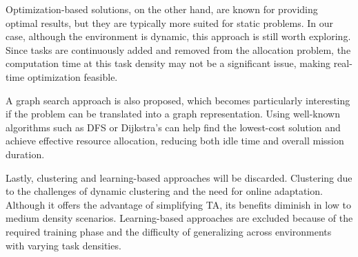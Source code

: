 Optimization-based solutions, on the other hand, are known for providing optimal results, but they are typically more suited for static problems. In our case, although the environment is dynamic, this approach is still worth exploring. Since tasks are continuously added and removed from the allocation problem, the computation time at this task density may not be a significant issue, making real-time optimization feasible.

A graph search approach is also proposed, which becomes particularly interesting if the problem can be translated into a graph representation. Using well-known algorithms such as \ac{DFS} or Dijkstra's can help find the lowest-cost solution and achieve effective resource allocation, reducing both idle time and overall mission duration.

Lastly, clustering and learning-based approaches will be discarded. Clustering due to the challenges of dynamic clustering and the need for online adaptation. Although it offers the advantage of simplifying \ac{TA}, its benefits diminish in low to medium density scenarios. Learning-based approaches are excluded because of the required training phase and the difficulty of generalizing across environments with varying task densities.